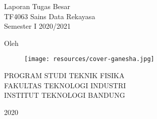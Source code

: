 \clearpage
\pagestyle{empty}

\begin{center}
\smallskip

    \Large \bfseries \MakeUppercase{\thetitle}
    \vfill

    \Large Laporan Tugas Besar \\ TF4063 Sains Data Rekayasa \\ Semester I 2020/2021
    \vfill


    \large Oleh

    \Large \theauthor

    \vfill
    \begin{figure}[h]
        \centering
      	\texttt{[image: resources/cover-ganesha.jpg]}
    \end{figure}
    \vfill

    \large
    \uppercase{
        Program Studi Teknik Fisika \\
        Fakultas Teknologi Industri \\
        Institut Teknologi Bandung
    }

    2020

\end{center}

\clearpage
